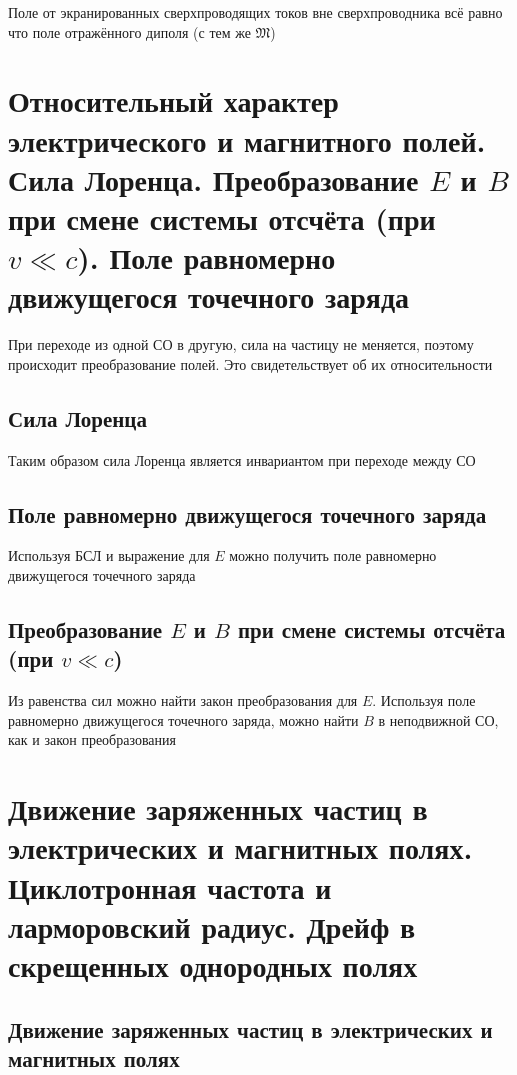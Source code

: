 \documentclass[a4paper, 14pt]{article}
\begin{document}
    Поле от экранированных сверхпроводящих токов вне сверхпроводника всё равно что поле отражённого диполя (с тем же
    $\mathfrak{M}$)
    
    \section{Относительный характер электрического и магнитного полей.
    Сила Лоренца.
    Преобразование $E$ и $B$ при смене системы отсчёта (при $v \ll c$).
    Поле равномерно движущегося точечного заряда}
    
    При переходе из одной СО в другую, сила на частицу не меняется, поэтому происходит преобразование полей.
    Это свидетельствует об их относительности
    
    \subsection{Сила Лоренца}
    
    Таким образом сила Лоренца является инвариантом при переходе между СО
    
    \subsection{Поле равномерно движущегося точечного заряда}
    
    Используя БСЛ и выражение для $E$ можно получить поле равномерно движущегося точечного заряда
    
    \subsection{Преобразование $E$ и $B$ при смене системы отсчёта (при $v \ll c$)}
    
    Из равенства сил можно найти закон преобразования для $E$.
    Используя поле равномерно движущегося точечного заряда, можно найти $B$ в неподвижной СО, как и закон преобразования
    
    \section{Движение заряженных частиц в электрических и магнитных полях.
    Циклотронная частота и ларморовский радиус.
    Дрейф в скрещенных однородных полях}
    
    \subsection{Движение заряженных частиц в электрических и магнитных полях}
    
\end{document}
